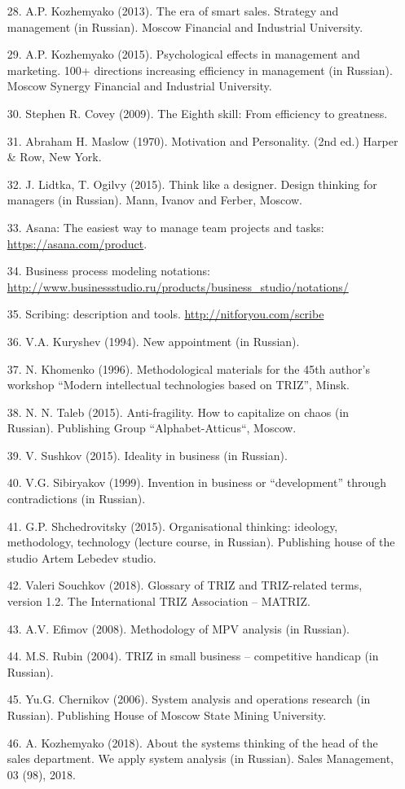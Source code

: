 \documentclass[11pt,a4paper]{book}
\begin{document}
\begin{itemize}
\item[28.] A.P. Kozhemyako (2013). The era of smart sales. Strategy and
  management (in Russian). Moscow Financial and Industrial University.
\item[29.] A.P. Kozhemyako (2015). Psychological effects in management and
  marketing. 100+ directions increasing efficiency in management (in Russian).
  Moscow Synergy Financial and Industrial University.
\item[30.] Stephen R. Covey (2009). The Eighth skill: From efficiency to
  greatness.
\item[31.] Abraham H. Maslow (1970). Motivation and Personality.  (2nd ed.)
  Harper \& Row, New York.
\item[32.] J. Lidtka, T.  Ogilvy (2015). Think like a designer. Design
  thinking for managers (in Russian). Mann, Ivanov and Ferber, Moscow.
\item[33.] Asana: The easiest way to manage team projects and tasks:
  \url{https://asana.com/product}.
\item[34.] Business process modeling notations:
  \url{http://www.businessstudio.ru/products/business_studio/notations/}
\item[35.] Scribing: description and tools. \url{http://nitforyou.com/scribe}
\item[36.] V.A. Kuryshev (1994). New appointment (in Russian). 
\item[37.] N. Khomenko (1996). Methodological materials for the 45th author’s
  workshop “Modern intellectual technologies based on TRIZ”, Minsk.
\item[38.] N. N. Taleb (2015). Anti-fragility. How to capitalize on chaos (in
  Russian). Publishing Group “Alphabet-Atticus“, Moscow.
\item[39.] V. Sushkov (2015). Ideality in business (in Russian).
\item[40.] V.G. Sibiryakov (1999). Invention in business or “development”
  through contradictions (in Russian).
\item[41.] G.P. Shchedrovitsky (2015). Organisational thinking: ideology,
  methodology, technology (lecture course, in Russian). Publishing house of
  the studio Artem Lebedev studio.
\item[42.] Valeri Souchkov (2018). Glossary of TRIZ and TRIZ-related terms,
  version 1.2. The International TRIZ Association -- MATRIZ.
\item[43.] A.V. Efimov (2008). Methodology of MPV analysis (in Russian).
\item[44.] M.S. Rubin (2004). TRIZ in small business -- competitive handicap
  (in Russian).
\item[45.] Yu.G. Chernikov (2006). System analysis and operations research (in
  Russian). Publishing House of Moscow State Mining University.
\item[46.] A. Kozhemyako (2018). About the systems thinking of the head of the
  sales department. We apply system analysis (in Russian). Sales Management,
  03 (98), 2018.
\end{itemize}
\end{document}
